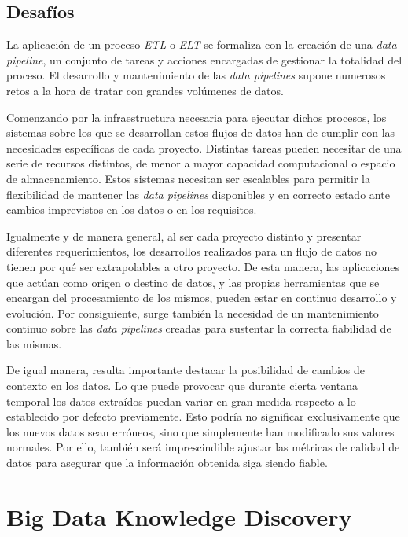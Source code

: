 \subsection{Desafíos}

La aplicación de un proceso \textit{ETL} o \textit{ELT} se formaliza con la creación de una \textit{data pipeline}, un conjunto de tareas y acciones encargadas de gestionar la totalidad del proceso. El desarrollo y mantenimiento de las \textit{data pipelines} supone numerosos retos a la hora de tratar con grandes volúmenes de datos.

Comenzando por la infraestructura necesaria para ejecutar dichos procesos, los sistemas sobre los que se desarrollan estos flujos de datos han de cumplir con las necesidades específicas de cada proyecto. Distintas tareas pueden necesitar de una serie de recursos distintos, de menor a mayor capacidad computacional o espacio de almacenamiento. Estos sistemas necesitan ser escalables para permitir la flexibilidad de mantener las \textit{data pipelines} disponibles y en correcto estado ante cambios imprevistos en los datos o en los requisitos.

Igualmente y de manera general, al ser cada proyecto distinto y presentar diferentes requerimientos, los desarrollos realizados para un flujo de datos no tienen por qué ser extrapolables a otro proyecto. De esta manera, las aplicaciones que actúan como origen o destino de datos, y las propias herramientas que se encargan del procesamiento de los mismos, pueden estar en continuo desarrollo y evolución. Por consiguiente, surge también la necesidad de un mantenimiento continuo sobre las \textit{data pipelines} creadas para sustentar la correcta fiabilidad de las mismas.

De igual manera, resulta importante destacar la posibilidad de cambios de contexto en los datos. Lo que puede provocar que durante cierta ventana temporal los datos extraídos puedan variar en gran medida respecto a lo establecido por defecto previamente. Esto podría no significar exclusivamente que los nuevos datos sean erróneos, sino que simplemente han modificado sus valores normales. Por ello, también será imprescindible ajustar las métricas de calidad de datos para asegurar que la información obtenida siga siendo fiable.

\section{Big Data Knowledge Discovery}

